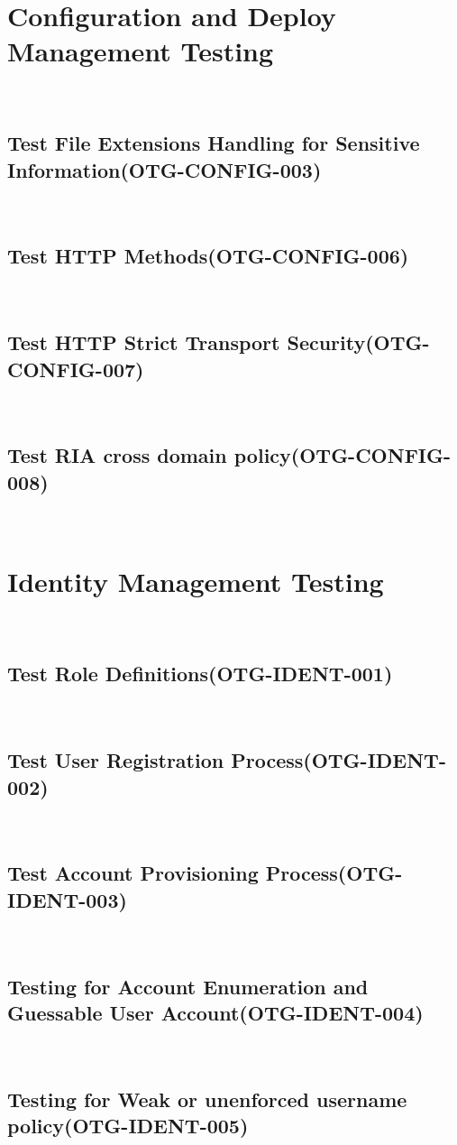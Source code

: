 \documentclass[headsepline,footsepline,footinclude=false,oneside,fontsize=11pt,paper=a4,listof=totoc,bibliography=totoc]{scrbook} %
\begin{document}
\pagebreak 


\section{Configuration and Deploy Management Testing}\
\subsection{Test File Extensions Handling for Sensitive Information(OTG-CONFIG-003)}\
\pagebreak 
\subsection{Test HTTP Methods(OTG-CONFIG-006)}\
\pagebreak 
\subsection{Test HTTP Strict Transport Security(OTG-CONFIG-007)}\
\pagebreak 
\subsection{Test RIA cross domain policy(OTG-CONFIG-008)}\

 
\pagebreak 
\section{Identity Management Testing}\
\subsection{Test Role Definitions(OTG-IDENT-001)}\
\pagebreak 
\subsection{Test User Registration Process(OTG-IDENT-002)}\
\pagebreak 
\subsection{Test Account Provisioning Process(OTG-IDENT-003)}\
\pagebreak 
\subsection{Testing for Account Enumeration and Guessable User Account(OTG-IDENT-004)}\
\pagebreak 
\subsection{Testing for Weak or unenforced username policy(OTG-IDENT-005)}\
 
\end{document}
